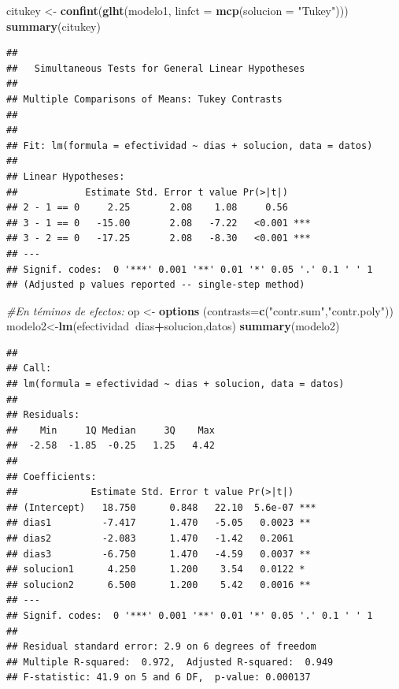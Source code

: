 \documentclass[]{book}
\newenvironment{Shaded}{\begin{snugshade}}{\end{snugshade}}
\newcommand{\KeywordTok}[1]{\textcolor[rgb]{0.13,0.29,0.53}{\textbf{#1}}}
\newcommand{\DataTypeTok}[1]{\textcolor[rgb]{0.13,0.29,0.53}{#1}}
\newcommand{\StringTok}[1]{\textcolor[rgb]{0.31,0.60,0.02}{#1}}
\newcommand{\CommentTok}[1]{\textcolor[rgb]{0.56,0.35,0.01}{\textit{#1}}}
\newcommand{\OperatorTok}[1]{\textcolor[rgb]{0.81,0.36,0.00}{\textbf{#1}}}
\newcommand{\NormalTok}[1]{#1}
\begin{document}
\begin{Shaded}
\begin{Highlighting}[]
\NormalTok{citukey <-}\StringTok{ }\KeywordTok{confint}\NormalTok{(}\KeywordTok{glht}\NormalTok{(modelo1, }\DataTypeTok{linfct =} \KeywordTok{mcp}\NormalTok{(}\DataTypeTok{solucion =} \StringTok{"Tukey"}\NormalTok{)))}
\KeywordTok{summary}\NormalTok{(citukey)}
\end{Highlighting}
\end{Shaded}

\begin{verbatim}
## 
##   Simultaneous Tests for General Linear Hypotheses
## 
## Multiple Comparisons of Means: Tukey Contrasts
## 
## 
## Fit: lm(formula = efectividad ~ dias + solucion, data = datos)
## 
## Linear Hypotheses:
##            Estimate Std. Error t value Pr(>|t|)    
## 2 - 1 == 0     2.25       2.08    1.08     0.56    
## 3 - 1 == 0   -15.00       2.08   -7.22   <0.001 ***
## 3 - 2 == 0   -17.25       2.08   -8.30   <0.001 ***
## ---
## Signif. codes:  0 '***' 0.001 '**' 0.01 '*' 0.05 '.' 0.1 ' ' 1
## (Adjusted p values reported -- single-step method)
\end{verbatim}

\begin{Shaded}
\begin{Highlighting}[]
\CommentTok{#En téminos de efectos:}
\NormalTok{op <-}\StringTok{ }\KeywordTok{options}\NormalTok{ (}\DataTypeTok{contrasts=}\KeywordTok{c}\NormalTok{(}\StringTok{"contr.sum"}\NormalTok{,}\StringTok{"contr.poly"}\NormalTok{))}
\NormalTok{modelo2<-}\KeywordTok{lm}\NormalTok{(efectividad}\OperatorTok{~}\NormalTok{dias}\OperatorTok{+}\NormalTok{solucion,datos)}
\KeywordTok{summary}\NormalTok{(modelo2)}
\end{Highlighting}
\end{Shaded}

\begin{verbatim}
## 
## Call:
## lm(formula = efectividad ~ dias + solucion, data = datos)
## 
## Residuals:
##    Min     1Q Median     3Q    Max 
##  -2.58  -1.85  -0.25   1.25   4.42 
## 
## Coefficients:
##             Estimate Std. Error t value Pr(>|t|)    
## (Intercept)   18.750      0.848   22.10  5.6e-07 ***
## dias1         -7.417      1.470   -5.05   0.0023 ** 
## dias2         -2.083      1.470   -1.42   0.2061    
## dias3         -6.750      1.470   -4.59   0.0037 ** 
## solucion1      4.250      1.200    3.54   0.0122 *  
## solucion2      6.500      1.200    5.42   0.0016 ** 
## ---
## Signif. codes:  0 '***' 0.001 '**' 0.01 '*' 0.05 '.' 0.1 ' ' 1
## 
## Residual standard error: 2.9 on 6 degrees of freedom
## Multiple R-squared:  0.972,  Adjusted R-squared:  0.949 
## F-statistic: 41.9 on 5 and 6 DF,  p-value: 0.000137
\end{verbatim}
\end{document}
